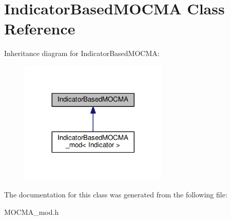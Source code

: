 \hypertarget{classIndicatorBasedMOCMA}{}\section{Indicator\+Based\+M\+O\+C\+MA Class Reference}
\label{classIndicatorBasedMOCMA}


Inheritance diagram for Indicator\+Based\+M\+O\+C\+MA\+:\nopagebreak
\begin{figure}[H]
\begin{center}
\leavevmode
\includegraphics[width=200pt]{classIndicatorBasedMOCMA__inherit__graph}
\end{center}
\end{figure}


The documentation for this class was generated from the following file\+:\begin{DoxyCompactItemize}
\item 
M\+O\+C\+M\+A\+\_\+mod.\+h\end{DoxyCompactItemize}
